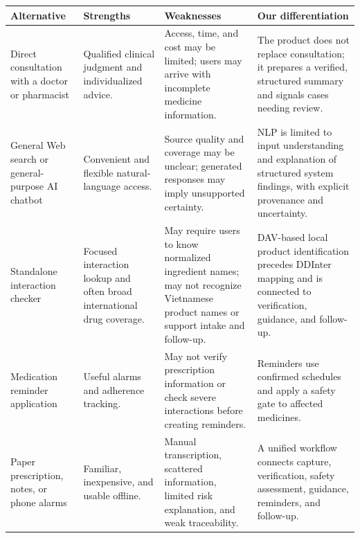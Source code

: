 \begin{longtable}{|L{0.23\textwidth}|L{0.23\textwidth}|L{0.24\textwidth}|L{0.20\textwidth}|}
\hline
\textbf{Alternative} & \textbf{Strengths} & \textbf{Weaknesses} & \textbf{Our differentiation}\\ \hline
Direct consultation with a doctor or pharmacist & Qualified clinical judgment and individualized advice. & Access, time, and cost may be limited; users may arrive with incomplete medicine information. & The product does not replace consultation; it prepares a verified, structured summary and signals cases needing review.\\ \hline
General Web search or general-purpose AI chatbot & Convenient and flexible natural-language access. & Source quality and coverage may be unclear; generated responses may imply unsupported certainty. & NLP is limited to input understanding and explanation of structured system findings, with explicit provenance and uncertainty.\\ \hline
Standalone interaction checker & Focused interaction lookup and often broad international drug coverage. & May require users to know normalized ingredient names; may not recognize Vietnamese product names or support intake and follow-up. & DAV-based local product identification precedes DDInter mapping and is connected to verification, guidance, and follow-up.\\ \hline
Medication reminder application & Useful alarms and adherence tracking. & May not verify prescription information or check severe interactions before creating reminders. & Reminders use confirmed schedules and apply a safety gate to affected medicines.\\ \hline
Paper prescription, notes, or phone alarms & Familiar, inexpensive, and usable offline. & Manual transcription, scattered information, limited risk explanation, and weak traceability. & A unified workflow connects capture, verification, safety assessment, guidance, reminders, and follow-up.\\ \hline
\end{longtable}

